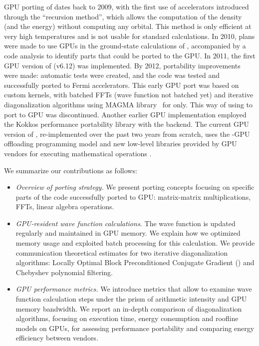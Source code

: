 \documentclass[twocolumn,superscriptaddress]{revtex4-1}
\begin{document}
GPU porting of \abinit dates back to 2009, with the first use of accelerators introduced through the ``recursion method'', which allows the computation of the density (and the energy) without computing any orbital. This method is only efficient at very high temperatures and is not usable for standard calculations. In 2010, plans were made to use GPUs in the ground-state calculations of \abinit, accompanied by a code analysis to identify parts that could be ported to the GPU. In 2011, the first GPU version of \abinit (v6.12) was implemented. By 2012, portability improvements were made: automatic tests were created, and the code was tested and successfully ported to \nvidia Fermi accelerators. This early GPU port was based on custom \cuda kernels, with batched FFTs (wave function not batched yet) and iterative diagonalization algorithms using MAGMA library~\cite{magma} for \nvidia only. This way of using \cuda to port \abinit to GPU was discontinued. Another earlier \nvidia GPU implementation employed the Kokkos performance portability library \cite{CARTEREDWARDS20143202} with the \cuda backend. The current GPU version of \abinit, re-implemented over the past two years from scratch, uses the \mpi-\openmp GPU offloading programming model and new low-level libraries provided by GPU vendors for executing mathematical operations \cite{torrent:tel-04812107}.

We summarize our contributions as follows:
\begin{itemize}
    \item \textit{Overview of porting strategy.} We present porting concepts focusing on specific parts of the code successfully ported to GPU: matrix-matrix multiplications, FFTs, linear algebra operations.
    \item \textit{GPU-resident wave function calculations.} The wave function is updated regularly and maintained in GPU memory. We explain how we optimized memory usage and exploited batch processing for this calculation. We provide \mpi communication theoretical estimates for two iterative diagonalization algorithms: Locally Optimal Block Preconditioned Conjugate Gradient (\lobpcg) and Chebyshev polynomial filtering. 
    \item \textit{GPU performance metrics.} We introduce metrics that allow to examine wave function calculation steps under the prism of arithmetic intensity and GPU memory bandwidth. We report an in-depth comparison of diagonalization algorithms, focusing on execution time, energy consumption and roofline models on GPUs, for assessing performance portability and comparing energy efficiency between vendors.
\end{itemize}
\end{document}
